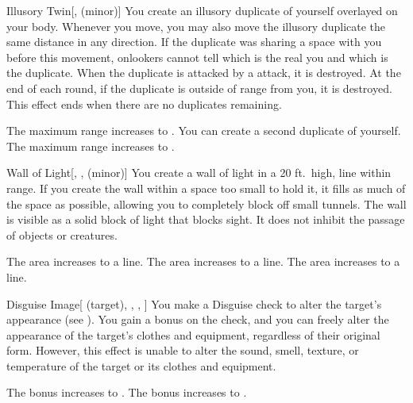 \lowercase{\hypertarget{spell:Illusory Twin}{}}\label{spell:Illusory Twin}
\begin{freeability}[Rank 2]{\hypertarget{spell:Illusory Twin}{Illusory Twin}}[,  (minor)]
\targetrule
You create an illusory duplicate of yourself overlayed on your body.
Whenever you move, you may also move the illusory duplicate the same distance in any direction.
If the duplicate was sharing a space with you before this movement, onlookers cannot tell which is the real you and which is the duplicate.
When the duplicate is attacked by a  attack, it is destroyed.
At the end of each round, if the duplicate is outside of \rngmed range from you, it is destroyed.
This effect ends when there are no duplicates remaining.

\rankline
{} The maximum range increases to \rnglong.
 You can create a second duplicate of yourself.
 The maximum range increases to \rngext.
\end{freeability}
\vspace{0.25em}



\lowercase{\hypertarget{spell:Wall of Light}{}}\label{spell:Wall of Light}
\begin{freeability}[Rank 2]{\hypertarget{spell:Wall of Light}{Wall of Light}}[, ,  (minor)]
\targetrule
You create a wall of light in a 20 ft.\ high, \areamed line within \rngmed range.
If you create the wall within a space too small to hold it, it fills as much of the space as possible, allowing you to completely block off small tunnels.
The wall is visible as a solid block of light that blocks sight.
It does not inhibit the passage of objects or creatures.

\rankline
{} The area increases to a \arealarge line.
 The area increases to a \areahuge line.
 The area increases to a \areaext line.
\end{freeability}
\vspace{0.25em}



\lowercase{\hypertarget{spell:Disguise Image}{}}\label{spell:Disguise Image}
\begin{attuneability}[Rank 3]{\hypertarget{spell:Disguise Image}{Disguise Image}}[ (target), , , ]
You make a Disguise check to alter the target's appearance (see ).
You gain a  bonus on the check, and you can freely alter the appearance of the target's clothes and equipment, regardless of their original form.
However, this effect is unable to alter the sound, smell, texture, or temperature of the target or its clothes and equipment.

\rankline
{} The bonus increases to .
 The bonus increases to .
\end{attuneability}
\vspace{0.25em}



